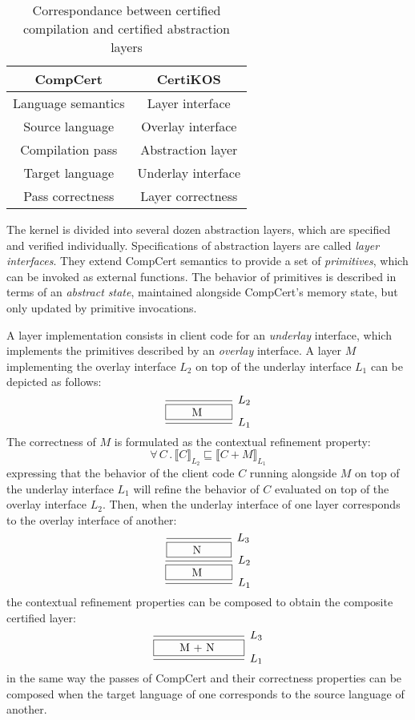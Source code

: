 \documentclass[draft,11pt]{report}
\theoremstyle{definition}
\newcommand{\refby}{\sqsubseteq} %
\begin{document}
\begin{table}
  \centering
  \begin{tabular}{c@{\qquad}c}
    \hline
    CompCert & CertiKOS \\
    \hline
    Language semantics & Layer interface \\
    Source language & Overlay interface \\
    Compilation pass & Abstraction layer \\
    Target language & Underlay interface \\
    Pass correctness & Layer correctness \\
    \hline
  \end{tabular}
  \caption{
    Correspondance between certified compilation
    and certified abstraction layers
  }
  \label{tbl:compccal}
\end{table}

The kernel is divided into several dozen abstraction layers,
which are specified and verified individually.
Specifications of abstraction layers
are called \emph{layer interfaces}.
They extend CompCert semantics
to provide a set of \emph{primitives},
which can be invoked as
external functions.
The behavior of primitives is described in terms of
an \emph{abstract state},
maintained alongside CompCert's memory state,
but only updated by primitive invocations.

A layer implementation consists in client code
for an \emph{underlay} interface,
which implements the primitives described
by an \emph{overlay} interface.
A layer $M$ implementing the overlay interface $L_2$
on top of the underlay interface $L_1$ can be depicted as follows:
\[
  \begin{prooftree}
    \infer0[$L_2$]{\fbox{\qquad M \qquad}}
    \infer1[$L_1$]{}
  \end{prooftree}
\]
The correctness of $M$ is formulated as
the contextual refinement property:
\[
  \forall \, C \, . \,
  \llbracket C \rrbracket_{L_2} \refby
  \llbracket C + M \rrbracket_{L_1}
\]
expressing that the behavior of the client code $C$
running alongside $M$ on top of the underlay interface $L_1$
will refine the behavior of $C$
evaluated on top of the overlay interface $L_2$.
Then,
when the underlay interface of one layer
corresponds to the overlay interface of another:
\[
  \begin{prooftree}
    \infer0[$L_3$]{\fbox{\qquad N \qquad}}
    \infer1[$L_2$]{\fbox{\qquad M \qquad}}
    \infer1[$L_1$]{}
  \end{prooftree}
\]
the contextual refinement properties can be composed
to obtain the composite certified layer:
\[
  \begin{prooftree}
    \infer0[$L_3$]{\fbox{\qquad M + N \qquad}}
    \infer1[$L_1$]{}
  \end{prooftree}
\]
in the same way the passes of CompCert and their correctness properties
can be composed when the target language of one corresponds to
the source language of another.
\end{document}
